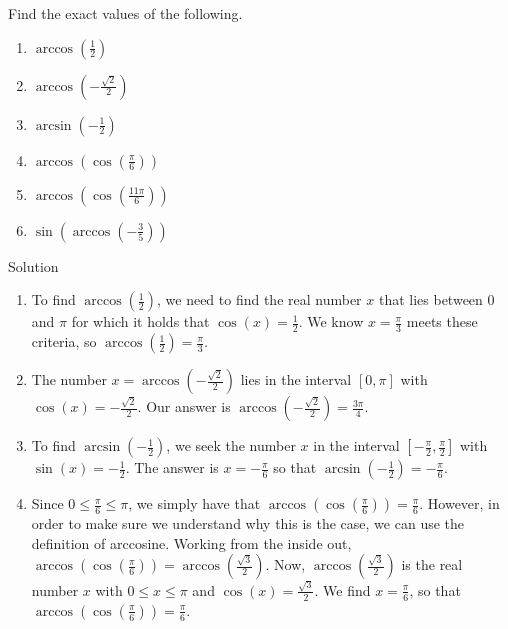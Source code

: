 \begin{example}  \label{arccosinesineex} 
 Find the exact values of the following.

\begin{multicols}{2}

\begin{enumerate}

\item $\arccos\left(\frac{1}{2}\right)$
\item  $\arccos\left(-\frac{\sqrt{2}}{2}\right)$
\item  $\arcsin\left(-\frac{1}{2}\right)$
\item  $\arccos\left( \cos\left(\frac{\pi}{6}\right)\right)$
\item  $\arccos\left( \cos\left(\frac{11\pi}{6}\right)\right)$
\item  $\sin\left(\arccos\left(-\frac{3}{5}\right)\right)$
\end{enumerate}

\end{multicols}

Solution 

\begin{enumerate}

\item  To find $\arccos\left(\frac{1}{2}\right)$, we need to find the real number $x$ that lies between $0$ and $\pi$ for which it holds that $\cos(x) = \frac{1}{2}$. We know $x = \frac{\pi}{3}$ meets these criteria, so $\arccos\left(\frac{1}{2}\right)= \frac{\pi}{3}$.

\item  The number $x = \arccos\left(-\frac{\sqrt{2}}{2}\right)$ lies in the interval $[0,\pi]$ with $\cos(x) = -\frac{\sqrt{2}}{2}$.  Our answer is $\arccos\left(-\frac{\sqrt{2}}{2}\right) = \frac{3\pi}{4}$.

\item  To find  $\arcsin\left(-\frac{1}{2}\right)$, we seek the number $x$ in the interval $\left[-\frac{\pi}{2}, \frac{\pi}{2}\right]$ with $\sin(x) = -\frac{1}{2}$.  The answer is $x = -\frac{\pi}{6}$ so that $\arcsin\left(-\frac{1}{2}\right) = -\frac{\pi}{6}$.

\item  Since $0 \leq \frac{\pi}{6} \leq \pi$, we simply have that $\arccos\left( \cos\left(\frac{\pi}{6}\right)\right) = \frac{\pi}{6}$.  However, in order to make sure we understand why this is the case, we can use the definition of arccosine.  Working from the inside out,  $\arccos\left( \cos\left(\frac{\pi}{6}\right)\right) = \arccos\left( \frac{\sqrt{3}}{2}\right)$.  Now, $\arccos\left( \frac{\sqrt{3}}{2}\right)$ is the real number $x$ with $0 \leq x \leq \pi$ and $\cos(x) = \frac{\sqrt{3}}{2}$.  We find $x = \frac{\pi}{6}$, so that  $\arccos\left( \cos\left(\frac{\pi}{6}\right)\right) = \frac{\pi}{6}$.


\end{enumerate}
\end{example}
